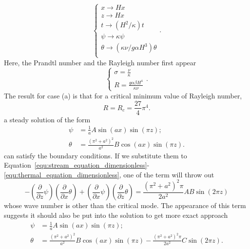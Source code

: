 \begin{equation}
	\left\{
	\begin{matrix}
	x\rightarrow Hx\\
	z\rightarrow Hx\\
	t\rightarrow\left( H^2/\kappa \right)t\\
	\psi\rightarrow \kappa\psi\\
	\theta\rightarrow \left( \kappa\nu/g\alpha H^3 \right)\theta\\
	\end{matrix}
	\right. .
\end{equation}
Here, the Prandtl number and the Rayleigh number first appear
\begin{equation*}
	\left\{\begin{matrix}\sigma=\frac{\nu}{\kappa}\\
	R=\frac{g\alpha\beta H^4}{\kappa\nu}\end{matrix}\right. .
\end{equation*}
The result for case (a) is that for a critical minimum value of Rayleigh number,
\begin{equation*}
	R=R_c=\frac{27}{4}\pi^4.
\end{equation*}
a steady solution of the form
\begin{align*}
	\psi&=\frac{1}{a}A\sin\left(ax\right)\sin\left(\pi z\right);\\
	\theta&=\frac{\left(\pi^2+a^2\right)^2}{a^2}B\cos\left(ax\right)\sin\left(\pi z\right).
\end{align*}
can satisfy the boundary conditions. If we substitute them to Equation~\ref{equ:stream_equation_dimensionless}-\ref{equ:thermal_equation_dimensionless}, one of the term will throw out
\begin{equation*}
	-\left(\frac{\partial}{\partial z}\psi\right)\left( \frac{\partial}{\partial x}\theta \right)+\left(\frac{\partial}{\partial x}\psi\right)\left( \frac{\partial}{\partial z}\theta \right)=\frac{\left(\pi^2+a^2\right)^2\pi}{2a^2}AB\sin\left( 2\pi z \right)
\end{equation*}
whose wave number is other than the critical mode. The appearance of this term suggests it should also be put into the solution to get more exact approach
\begin{align*}
	\psi&=\frac{1}{a}A\sin\left(ax\right)\sin\left(\pi z\right);\\
	\theta&=\frac{\left(\pi^2+a^2\right)^2}{a^2}B\cos\left(ax\right)\sin\left(\pi z\right)-\frac{\left(\pi^2+a^2\right)^2\pi}{2a^2}C\sin\left( 2\pi z \right).
\end{align*}
